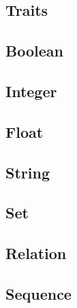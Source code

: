 



\subsection{Traits}

\subsection{Boolean}
\subsection{Integer}
\subsection{Float}
\subsection{String}
\subsection{Set}
\subsection{Relation}
\subsection{Sequence}
